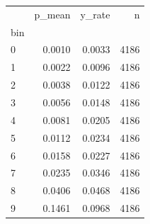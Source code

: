 \begin{tabular}{lrrr}
\toprule
 & p_mean & y_rate & n \\
bin &  &  &  \\
\midrule
0 & 0.0010 & 0.0033 & 4186 \\
1 & 0.0022 & 0.0096 & 4186 \\
2 & 0.0038 & 0.0122 & 4186 \\
3 & 0.0056 & 0.0148 & 4186 \\
4 & 0.0081 & 0.0205 & 4186 \\
5 & 0.0112 & 0.0234 & 4186 \\
6 & 0.0158 & 0.0227 & 4186 \\
7 & 0.0235 & 0.0346 & 4186 \\
8 & 0.0406 & 0.0468 & 4186 \\
9 & 0.1461 & 0.0968 & 4186 \\
\bottomrule
\end{tabular}
